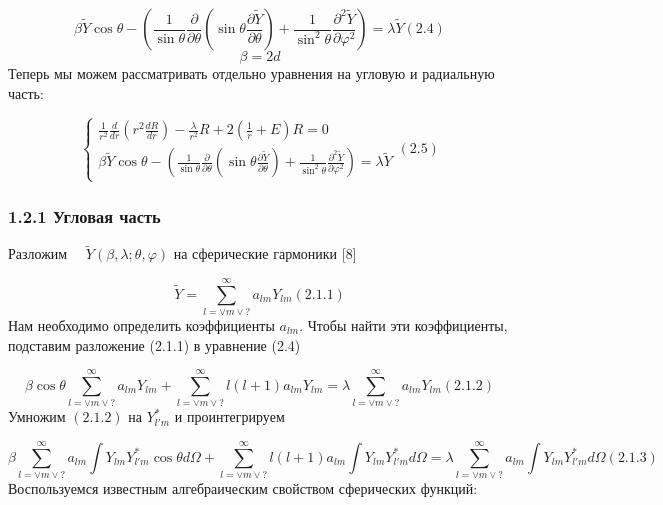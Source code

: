 \documentclass[a4paper]{article}
\begin{document}
\begin{equation*}
\beta \widetilde Y\cos \theta -\left(\frac 1{\sin \theta }\frac{{\partial}}{{\partial}\theta }\left(\sin \theta
\frac{{\partial}\widetilde Y}{{\partial}\theta }\right)+\frac 1{\sin ^2\theta }\frac{{\partial}^2\widetilde
Y}{{\partial}\varphi ^2}\right)=\lambda \widetilde Y(2.4)
\end{equation*}
\begin{equation*}
\beta =2d
\end{equation*}
Теперь мы можем рассматривать отдельно уравнения на угловую и радиальную часть:

\begin{equation*}
\left\{\begin{matrix}\frac 1{r^2}\frac d{\mathit{dr}}\left(r^2\frac{dR}{\mathit{dr}}\right)-\frac{\lambda
}{r^2}R+2\left(\frac 1 r+E\right)R=0\\\beta \widetilde Y\cos \theta -\left(\frac 1{\sin \theta
}\frac{{\partial}}{{\partial}\theta }\left(\sin \theta \frac{{\partial}\widetilde Y}{{\partial}\theta }\right)+\frac
1{\sin ^2\theta }\frac{{\partial}^2\widetilde Y}{{\partial}\varphi ^2}\right)=\lambda \widetilde
Y\end{matrix}\right.(2.5)
\end{equation*}
\subsubsection[1.2.1 Угловая часть]{1.2.1
Угловая часть}
\hypertarget{RefHeading4675463868395}{}Разложим \ \  $\widetilde
Y(\beta ,\lambda ;\theta ,\varphi )$ на
сферические гармоники [8]

\begin{equation*}
\widetilde Y=\sum _{l=\vee m\vee ?}^{{\infty}}a_{\mathit{lm}}Y_{\mathit{lm}}(2.1.1)
\end{equation*}
Нам необходимо определить
коэффициенты  $a_{\mathit{lm}}$.
Чтобы найти эти коэффициенты, подставим разложение (2.1.1) в уравнение (2.4)

\begin{equation*}
\beta \cos \theta \sum _{l=\vee m\vee ?}^{{\infty}}a_{\mathit{lm}}Y_{\mathit{lm}}+\sum _{l=\vee m\vee
?}^{{\infty}}l(l+1)a_{\mathit{lm}}Y_{\mathit{lm}}=\lambda \sum _{l=\vee m\vee
?}^{{\infty}}a_{\mathit{lm}}Y_{\mathit{lm}}(2.1.2)
\end{equation*}
Умножим  $(2.1.2)$ на  $Y_{l'm}^{\ast }$ и
проинтегрируем

\begin{equation*}
\beta \sum _{l=\vee m\vee ?}^{{\infty}}a_{\mathit{lm}}\int Y_{\mathit{lm}}Y_{l'm}^{\ast }\cos \theta \mathit{d\Omega
}+\sum _{l=\vee m\vee ?}^{{\infty}}l(l+1)a_{\mathit{lm}}\int Y_{\mathit{lm}}Y_{l'm}^{\ast }\mathit{d\Omega }=\lambda
\sum _{l=\vee m\vee ?}^{{\infty}}a_{\mathit{lm}}\int Y_{\mathit{lm}}Y_{l'm}^{\ast }\mathit{d\Omega }(2.1.3)
\end{equation*}
Воспользуемся известным алгебраическим свойством сферических функций:
\end{document}

